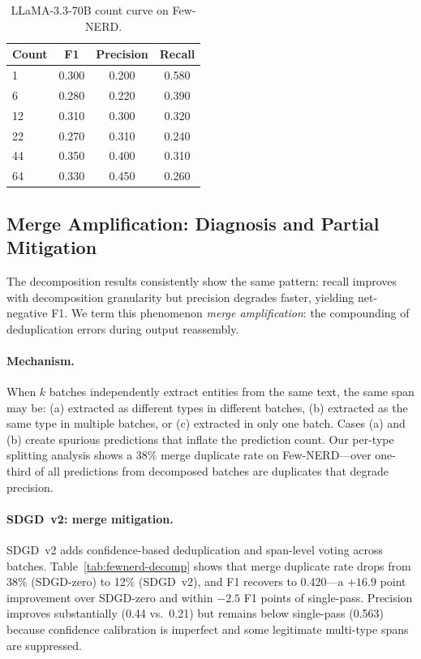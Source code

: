 \documentclass[11pt,a4paper]{article}
\begin{document}
\begin{table}[t]
\centering
\caption{LLaMA-3.3-70B count curve on Few-NERD.}
\label{tab:llama-count}
\begin{tabular}{lccc}
\toprule
\textbf{Count} & \textbf{F1} & \textbf{Precision} & \textbf{Recall} \\
\midrule
1  & 0.300 & 0.200 & 0.580 \\
6  & 0.280 & 0.220 & 0.390 \\
12 & 0.310 & 0.300 & 0.320 \\
22 & 0.270 & 0.310 & 0.240 \\
44 & 0.350 & 0.400 & 0.310 \\
64 & 0.330 & 0.450 & 0.260 \\
\bottomrule
\end{tabular}
\end{table}

\subsection{Merge Amplification: Diagnosis and Partial Mitigation}
\label{sec:merge}

The decomposition results consistently show the same pattern: recall improves with decomposition granularity but precision degrades faster, yielding net-negative F1. We term this phenomenon \emph{merge amplification}: the compounding of deduplication errors during output reassembly.

\paragraph{Mechanism.}
When $k$ batches independently extract entities from the same text, the same span may be: (a) extracted as different types in different batches, (b) extracted as the same type in multiple batches, or (c) extracted in only one batch. Cases (a) and (b) create spurious predictions that inflate the prediction count. Our per-type splitting analysis shows a 38\% merge duplicate rate on Few-NERD---over one-third of all predictions from decomposed batches are duplicates that degrade precision.

\paragraph{SDGD~v2: merge mitigation.}
SDGD~v2 adds confidence-based deduplication and span-level voting across batches. Table~\ref{tab:fewnerd-decomp} shows that merge duplicate rate drops from 38\% (SDGD-zero) to 12\% (SDGD~v2), and F1 recovers to 0.420---a $+16.9$ point improvement over SDGD-zero and within $-2.5$ F1 points of single-pass. Precision improves substantially (0.44 vs.\ 0.21) but remains below single-pass (0.563) because confidence calibration is imperfect and some legitimate multi-type spans are suppressed.
\end{document}

